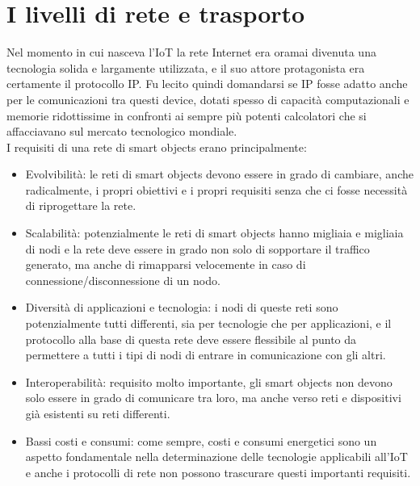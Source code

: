 \section{I livelli di rete e trasporto}
Nel momento in cui nasceva l'IoT la rete Internet era oramai divenuta una tecnologia solida e largamente utilizzata, e il suo attore protagonista era certamente il protocollo IP. Fu lecito quindi domandarsi se IP fosse adatto anche per le comunicazioni tra questi device, dotati spesso di capacità computazionali e memorie ridottissime in confronti ai sempre più potenti calcolatori che si affacciavano sul mercato tecnologico mondiale.
\\I requisiti di una rete di smart objects erano principalmente:
\begin{itemize}
\item Evolvibilità: le reti di smart objects devono essere in grado di cambiare, anche radicalmente, i propri obiettivi e i propri requisiti senza che ci fosse necessità di riprogettare la rete.
\item Scalabilità: potenzialmente le reti di smart objects hanno migliaia e migliaia di nodi e la rete deve essere in grado non solo di sopportare il traffico generato, ma anche di rimapparsi velocemente in caso di connessione/disconnessione di un nodo.
\item Diversità di applicazioni e tecnologia: i nodi di queste reti sono potenzialmente tutti differenti, sia per tecnologie che per applicazioni, e il protocollo alla base di questa rete deve essere flessibile al punto da permettere a tutti i tipi di nodi di entrare in comunicazione con gli altri.
\item Interoperabilità: requisito molto importante, gli smart objects non devono solo essere in grado di comunicare tra loro, ma anche verso reti e dispositivi già esistenti su reti differenti.
\item Bassi costi e consumi: come sempre, costi e consumi energetici sono un aspetto fondamentale nella determinazione delle tecnologie applicabili all'IoT e anche i protocolli di rete non possono trascurare questi importanti requisiti.
\end{itemize}

